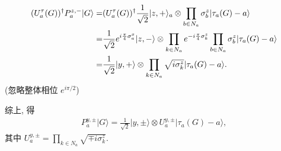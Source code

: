 \documentclass{assignment}
\begin{document}
\begin{pf}
\begin{itemize}
        \begin{align}
            \notag(U_a^{\tau}(G))^{\dagger}P_a^{z,-}\lvert G\rangle=&(U_a^{\tau}(G))^{\dagger}\frac{1}{\sqrt{2}}\lvert z,+\rangle_a\otimes\prod_{b\in N_a}\sigma_b^z\lvert\tau_a(G)-a\rangle\\
            \notag=&\frac{1}{\sqrt{2}}e^{i\frac{\pi}{4}\sigma_a^x}\lvert z,-\rangle\otimes\prod_{k\in N_a}e^{-i\frac{\pi}{4}\sigma_k^z}\prod_{b\in N_a}\sigma_b^z\lvert\tau_a(G)-a\rangle\\
            \notag=&\frac{1}{\sqrt{2}}\lvert y,+\rangle\otimes\prod_{k\in N_a}\sqrt{i\sigma_k^z}\lvert\tau_a(G)-a\rangle.
        \end{align}
        (忽略整体相位 $e^{i\pi/2}$)
    \end{itemize}
    综上, 得
    \begin{align}
        P_a^{y,\pm}\lvert G\rangle=\frac{1}{\sqrt{2}}\lvert y,\pm\rangle\otimes U_a^{y,\pm}\lvert\tau_a(G)-a\rangle,
    \end{align}
    其中 $U_a^{y,\pm}=\prod_{k\in N_a}\sqrt{\mp i\sigma_k^z}$.


\end{pf}
\end{document}
